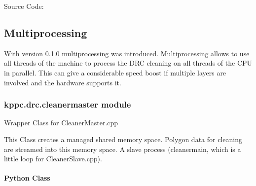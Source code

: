 \documentclass[a4paper,10pt,english]{sphinxmanual}
\begin{document}
Source Code: {\hyperref[\detokenize{source_code/drcsl_source:drcslsource}]{}}


\subsection{Multiprocessing}
\label{\detokenize{drc/drc:multiprocessing}}
With version 0.1.0 multiprocessing was introduced. Multiprocessing allows to use all threads of the machine to process the DRC cleaning on all threads of the CPU in parallel. This can give a considerable speed boost if multiple layers are involved and the hardware supports it.


\subsubsection{kppc.drc.cleanermaster module}
\label{\detokenize{drc/drc:kppc-drc-cleanermaster-module}}\label{\detokenize{drc/drc:cm}}
Wrapper Class for CleanerMaster.cpp

This Class creates a managed shared memory space. Polygon data for cleaning are streamed into this memory space. A slave process (cleanermain, which is a little loop for CleanerSlave.cpp).


\paragraph{Python Class}
\label{\detokenize{drc/drc:python-class}}
\end{document}
